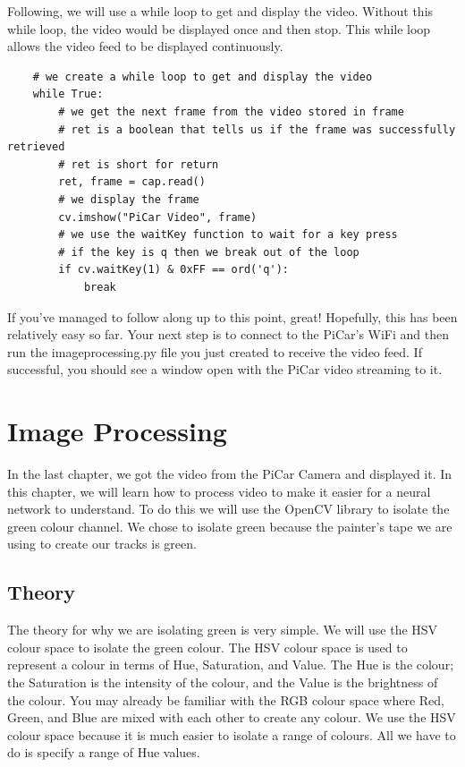 \documentclass[11pt]{report}
\begin{document}
Following, we will use a while loop to get and display the video. Without this while loop, the video would be displayed once and then stop. This while loop allows the video feed to be displayed continuously.

\begin{verbatim}
    # we create a while loop to get and display the video
    while True:
        # we get the next frame from the video stored in frame
        # ret is a boolean that tells us if the frame was successfully retrieved
        # ret is short for return
        ret, frame = cap.read()
        # we display the frame
        cv.imshow("PiCar Video", frame)
        # we use the waitKey function to wait for a key press
        # if the key is q then we break out of the loop
        if cv.waitKey(1) & 0xFF == ord('q'):
            break
\end{verbatim}

If you’ve managed to follow along up to this point, great! Hopefully, this has been relatively easy so far.
Your next step is to connect to the PiCar's WiFi and then run the imageprocessing.py file you just created to receive the video feed. If successful, you should see a window open with the PiCar video streaming to it.

\chapter{Image Processing}
In the last chapter, we got the video from the PiCar Camera and displayed it. In this chapter, we will learn how to process video to make it easier for a neural network to understand. To do this we will use the OpenCV library to isolate the green colour channel. We chose to isolate green because the painter's tape we are using to create our tracks is green.

\pagebreak

\section{Theory}
The theory for why we are isolating green is very simple. We will use the HSV colour space to isolate the green colour. The HSV colour space is used to represent a colour in terms of Hue, Saturation, and Value. The Hue is the colour; the Saturation is the intensity of the colour, and the Value is the brightness of the colour. You may already be familiar with the RGB colour space where Red, Green, and Blue are mixed with each other to create any colour. We use the HSV colour space because it is much easier to isolate a range of colours. All we have to do is specify a range of Hue values.
\end{document}
